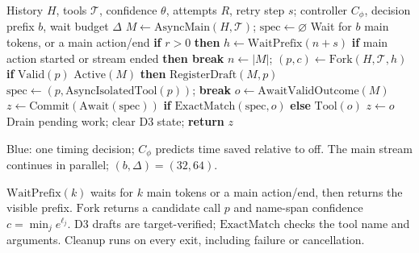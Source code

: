 \begin{algorithm}[H]
\caption{\spork{} with Learned First-Launch Timing}
\label{alg:spork-timing}
\begin{algorithmic}[1]
\REQUIRE History $H$, tools $\mathcal{T}$, confidence $\theta$, attempts $R$, retry step $s$;
{\color{TimingBlue} controller $C_\phi$, decision prefix $b$, wait budget $\Delta$}
\STATE $M \gets \mathrm{AsyncMain}(H,\mathcal{T})$; $\mathrm{spec} \gets \varnothing$
\STATE Wait for $b$ main tokens, or a main action/end
        \STATE \textbf{if} $r>0$ \textbf{then} $h\gets\mathrm{WaitPrefix}(n+s)$
        \STATE \textbf{if} main action started or stream ended \textbf{then break}
        \STATE $n\gets |M|$; $(p,c)\gets\mathrm{Fork}(H,\mathcal{T},h)$ 
        \STATE \textbf{if} $\mathrm{Valid}(p)$ \AND $\mathrm{Active}(M)$ \textbf{then} $\mathrm{RegisterDraft}(M,p)$ 
            \STATE $\mathrm{spec}\gets(p,\mathrm{AsyncIsolatedTool}(p))$; \textbf{break} 
        \ENDIF
    \ENDFOR
\ENDIF
\STATE $o\gets\mathrm{AwaitValidOutcome}(M)$
    \STATE $z\gets\mathrm{Commit}(\mathrm{Await}(\mathrm{spec}))$ \textbf{if} $\mathrm{ExactMatch}(\mathrm{spec},o)$ \textbf{else} $\mathrm{Tool}(o)$
\ELSE
    \STATE $z\gets o$ 
\ENDIF
\STATE Drain pending work; clear D3 state; \textbf{return} $z$
\end{algorithmic}
\vspace{4pt}
{\footnotesize\noindent
\textcolor{TimingBlue}{Blue: one timing decision; $C_\phi$ predicts time saved relative to off.}
The main stream continues in parallel; $(b,\Delta)=(32,64)$.\par
\vspace{2pt}\noindent
$\mathrm{WaitPrefix}(k)$ waits for $k$ main tokens or a main action/end, then returns the visible prefix.
$\mathrm{Fork}$ returns a candidate call $p$ and name-span confidence
$c=\min_j e^{\ell_j}$.
D3 drafts are target-verified; $\mathrm{ExactMatch}$ checks the tool name and arguments.
Cleanup runs on every exit, including failure or cancellation.\par}
\end{algorithm}
